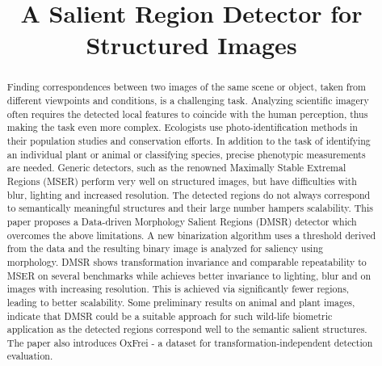\documentclass[conference,compsoc]{IEEEtran}
\begin{document}
%
\title{A Salient Region Detector for Structured Images}


\author{
}

\maketitle

\begin{abstract}
Finding correspondences between two images of the same scene or object, taken from different viewpoints and conditions, is a challenging task. Analyzing scientific imagery often requires the detected local features to coincide with the human perception, thus making the task even more complex. Ecologists use photo-identification methods in their population studies and conservation efforts. In addition to the task of identifying an individual plant or animal or classifying species, precise phenotypic measurements are needed. Generic detectors, such as the renowned Maximally Stable Extremal Regions (MSER) perform very well on structured images, but have difficulties with blur, lighting and increased resolution. The detected regions do not always correspond to semantically meaningful structures and their large number hampers scalability. This paper proposes a Data-driven Morphology Salient Regions (DMSR) detector which overcomes the above limitations. A new binarization algorithm uses a threshold derived from the data and the resulting binary image is analyzed for saliency using morphology.  DMSR shows transformation invariance and comparable repeatability to MSER on several benchmarks while achieves better invariance to lighting, blur and on images with increasing resolution. This is achieved via significantly fewer regions, leading to better scalability. Some preliminary results on animal and plant images, indicate that DMSR could be a suitable approach for such wild-life biometric application as the detected regions correspond well to the semantic salient structures. The paper also introduces OxFrei - a dataset for transformation-independent detection evaluation. 

\end{abstract}
\end{document}
